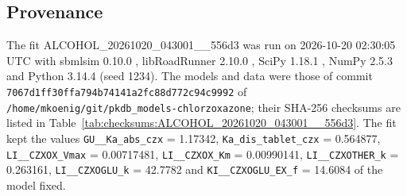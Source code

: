 \subsection{Provenance}

The fit ALCOHOL\_20261020\_043001\_\_556d3 was run on 2026-10-20 02:30:05 UTC with sbmlsim 0.10.0 \cite{Koenig2026_sbmlsim}, libRoadRunner 2.10.0 \cite{Welsh2023}, SciPy 1.18.1 \cite{Virtanen2020}, NumPy 2.5.3 \cite{Harris2020} and Python 3.14.4 (seed 1234). The models and data were those of commit \texttt{7067d1ff30ffa794b74141a2fc88d772c94c9992} of \texttt{/home/mkoenig/git/pkdb\_models-chlorzoxazone}; their SHA-256 checksums are listed in Table~\ref{tab:checksums:ALCOHOL_20261020_043001__556d3}. The fit kept the values \texttt{GU\_\_Ka\_abs\_czx} = 1.17342, \texttt{Ka\_dis\_tablet\_czx} = 0.564877, \texttt{LI\_\_CZXOX\_Vmax} = 0.00717481, \texttt{LI\_\_CZXOX\_Km} = 0.00990141, \texttt{LI\_\_CZXOTHER\_k} = 0.263161, \texttt{LI\_\_CZXOGLU\_k} = 42.7782 and \texttt{KI\_\_CZXOGLU\_EX\_f} = 14.6084 of the model fixed.

